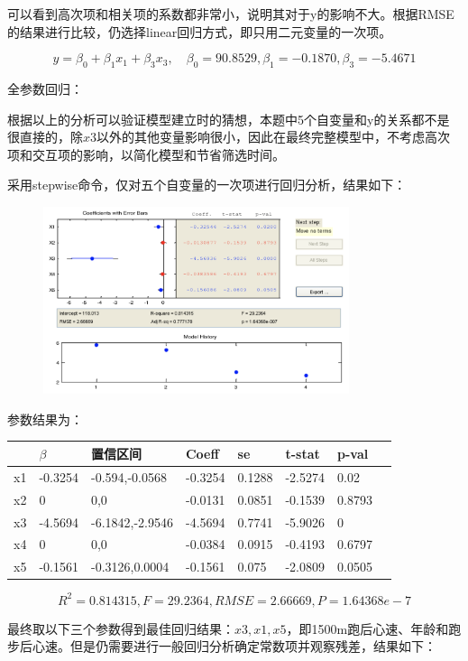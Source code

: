 \documentclass{article}
\begin{document}
可以看到高次项和相关项的系数都非常小，说明其对于y的影响不大。根据RMSE的结果进行比较，仍选择linear回归方式，即只用二元变量的一次项。

$$y=\beta_0+\beta_1x_1+\beta_3x_3,\quad \beta_0=90.8529,\beta_1=-0.1870,\beta_3=-5.4671$$

全参数回归：

根据以上的分析可以验证模型建立时的猜想，本题中5个自变量和y的关系都不是很直接的，除$x3$以外的其他变量影响很小，因此在最终完整模型中，不考虑高次项和交互项的影响，以简化模型和节省筛选时间。

采用stepwise命令，仅对五个自变量的一次项进行回归分析，结果如下：
\begin{figure}[H]
    \centering
    \includegraphics[width=0.8\textwidth]{pic7.png}
\end{figure}

参数结果为：

\begin{table}[H]
\centering
\begin{tabular}{|l|l|l|l|l|l|l|l|}
\hline
 &$\beta$&置信区间&Coeff&se&t-stat&p-val\\ \hline
x1 & -0.3254 & -0.594,-0.0568 & -0.3254  & 0.1288 & -2.5274  &0.02\\ \hline
x2 & 0 & 0,0 & -0.0131 & 0.0851 & -0.1539  & 0.8793 \\ \hline
x3 & -4.5694 & -6.1842,-2.9546 & -4.5694 & 0.7741 & -5.9026 & 0  \\ \hline
x4 & 0 & 0,0 & -0.0384 & 0.0915 & -0.4193  & 0.6797 \\ \hline
x5 & -0.1561 & -0.3126,0.0004 & -0.1561 & 0.075 & -2.0809  & 0.0505 \\ \hline
\end{tabular}
\end{table}

$$R^2=0.814315,F=29.2364,RMSE=2.66669,P=1.64368e-7$$

最终取以下三个参数得到最佳回归结果：$x3,x1,x5$，即1500m跑后心速、年龄和跑步后心速。但是仍需要进行一般回归分析确定常数项并观察残差，结果如下：
\end{document}
